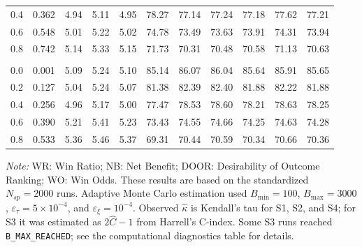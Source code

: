 \begin{table}[ht!]
\begin{tabular}{@{}ccccccccccc@{}}
0.4 & 0.362 & 4.94 & 5.11 & 4.95 & 78.27 & 77.14 & 77.24 & 77.18 & 77.62 & 77.21 \\
0.6 & 0.548 & 5.01 & 5.22 & 5.02 & 74.78 & 73.49 & 73.63 & 73.91 & 74.31 & 73.94 \\
0.8 & 0.742 & 5.14 & 5.33 & 5.15 & 71.73 & 70.31 & 70.48 & 70.58 & 71.13 & 70.63 \\
\addlinespace[4pt]
\multicolumn{11}{@{}l}{\textbf{S4: Binary + Continuous ($m=n=239$)}}\\
0.0 & 0.001 & 5.09 & 5.24 & 5.10 & 85.14 & 86.07 & 86.04 & 85.64 & 85.91 & 85.65 \\
0.2 & 0.127 & 5.04 & 5.24 & 5.07 & 81.38 & 82.39 & 82.40 & 81.88 & 82.22 & 81.88 \\
0.4 & 0.256 & 4.96 & 5.17 & 5.00 & 77.47 & 78.53 & 78.60 & 78.21 & 78.63 & 78.25 \\
0.6 & 0.390 & 5.21 & 5.41 & 5.23 & 73.43 & 74.55 & 74.66 & 74.25 & 74.63 & 74.28 \\
0.8 & 0.533 & 5.36 & 5.46 & 5.37 & 69.31 & 70.44 & 70.59 & 70.34 & 70.66 & 70.36 \\
\bottomrule
\end{tabular}
\parbox{0.92\textwidth}{\footnotesize \textit{Note:} WR: Win Ratio; NB: Net Benefit; DOOR: Desirability of Outcome Ranking; WO: Win Odds. These results are based on the standardized $N_{sp}=2000$ runs. Adaptive Monte Carlo estimation used $B_{\min}=100$, $B_{\max}=3000$, $\varepsilon_{\tau}=5\times 10^{-4}$, and $\varepsilon_{\xi}=10^{-4}$. Observed $\widehat{\kappa}$ is Kendall's tau for S1, S2, and S4; for S3 it was estimated as $2\widehat{C}-1$ from Harrell's C-index. Some S3 runs reached \texttt{B\_MAX\_REACHED}; see the computational diagnostics table for details.}
\end{table}

